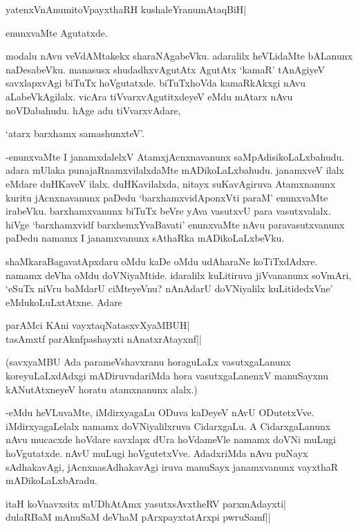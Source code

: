 \begin{shloka}
yatenxVnAnumitoVpayxthaRH kushaleYranumAtaqBiH|
\end{shloka}

enunxvaMte Agutatxde.

modalu nAvu veVdAMtakekx sharaNAgabeVku. adaralilx heVLidaMte bALanunx naDesabeVku. manasusx shudadhxvAgutAtx AgutAtx `kamaR' tAnAgiyeV savxlapxvAgi biTuTx hoVgutatxde. biTuTxhoVda kamaRkAkxgi nAvu aLabeVkAgilalx. vicAra tiVvarxvAgutitxdeyeV eMdu mAtarx nAvu noVDabahudu. hAge adu tiVvarxvAdare,

\begin{shloka}
`atarx barxhamx samashunxteV'.
\end{shloka}

-enunxvaMte I janamxdalelxV AtamxjAcnxnavanunx saMpAdisikoLaLxbahudu. adara mUlaka punajaRnamxvilalxdaMte mADikoLaLxbahudu. janamxveV ilalx eMdare duHKaveV ilalx. duHKavilalxda, nitayx suKavAgiruva Atamxnanunx kuritu jAcnxnavanunx paDedu `barxhamxvidAponxVti paraM' enunxvaMte irabeVku. barxhamxvanunx biTuTx beVre yAva vasutxvU para vasutxvalalx. hiVge `barxhamxvidf barxhemxYvaBavati' enunxvaMte nAvu paravasutxvanunx paDedu namamx I janamxvanunx sAthaRka mADikoLaLxbeVku.

shaMkaraBagavatApxdaru oMdu kaDe oMdu udAharaNe koTiTxdAdxre. namamx deVha oMdu doVNiyaMtide. idaralilx kuLitiruva jiVvananunx soVmAri, `eSuTx niVru baMdarU ciMteyeVnu? nAnAdarU doVNiyalilx kuLitidedxVne' eMdukoLuLxtAtxne. Adare

\begin{shloka}
parAMci KAni vayxtaqNatasxvXyaMBUH|\\
tasAmxtf parAknfpashayxti nAnatxrAtayxnf||
\end{shloka}

(savxyaMBU Ada parameVshavxranu horaguLaLx vasutxgaLanunx koreyuLaLxdAdxgi mADiruvudariMda hora vasutxgaLanenxV manuSayxnu kANutAtxneyeV horatu atamxnanunx alalx.)

-eMdu heVLuvaMte, iMdirxyagaLu ODuva kaDeyeV nAvU ODutetxVve. iMdirxyagaLelalx namamx doVNiyalilxruva CidarxgaLu. A CidarxgaLanunx nAvu mucacxde hoVdare savxlapx dUra hoVdameVle namamx doVNi muLugi hoVgutatxde. nAvU muLugi hoVgutetxVve. AdadxriMda nAvu puNayx sAdhakavAgi, jAcnxnasAdhakavAgi iruva manuSayx janamxvanunx vayxthaR mADikoLaLxbAradu.

\begin{shloka}
itaH koV\s navxsitx mUDhAtAmx yasutxsAvxtheRV parxmAdayxti|\\
dulaRBaM mAnuSaM deVhaM pArxpayxtatArxpi pwruSamf||
\end{shloka}

